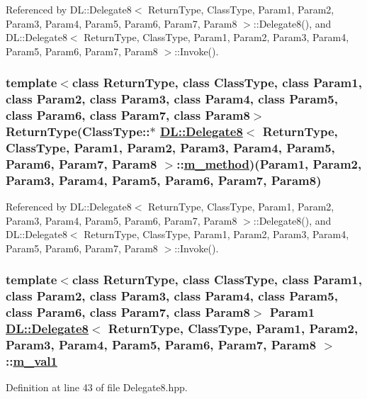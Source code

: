 Referenced by DL::Delegate8$<$ Return\-Type, Class\-Type, Param1, Param2, Param3, Param4, Param5, Param6, Param7, Param8 $>$::Delegate8(), and DL::Delegate8$<$ Return\-Type, Class\-Type, Param1, Param2, Param3, Param4, Param5, Param6, Param7, Param8 $>$::Invoke().\hypertarget{classDL_1_1Delegate8_r1}{
\subsubsection[m\_\-method]{\setlength{\rightskip}{0pt plus 5cm}template$<$class Return\-Type, class Class\-Type, class Param1, class Param2, class Param3, class Param4, class Param5, class Param6, class Param7, class Param8$>$ Return\-Type(Class\-Type::$\ast$ \hyperlink{classDL_1_1Delegate8}{DL::Delegate8}$<$ Return\-Type, Class\-Type, Param1, Param2, Param3, Param4, Param5, Param6, Param7, Param8 $>$::\hyperlink{classDL_1_1Delegate8_r1}{m\_\-method})(Param1, Param2, Param3, Param4, Param5, Param6, Param7, Param8)}}
\label{classDL_1_1Delegate8_r1}




Referenced by DL::Delegate8$<$ Return\-Type, Class\-Type, Param1, Param2, Param3, Param4, Param5, Param6, Param7, Param8 $>$::Delegate8(), and DL::Delegate8$<$ Return\-Type, Class\-Type, Param1, Param2, Param3, Param4, Param5, Param6, Param7, Param8 $>$::Invoke().\hypertarget{classDL_1_1Delegate8_r2}{
\subsubsection[m\_\-val1]{\setlength{\rightskip}{0pt plus 5cm}template$<$class Return\-Type, class Class\-Type, class Param1, class Param2, class Param3, class Param4, class Param5, class Param6, class Param7, class Param8$>$ Param1 \hyperlink{classDL_1_1Delegate8}{DL::Delegate8}$<$ Return\-Type, Class\-Type, Param1, Param2, Param3, Param4, Param5, Param6, Param7, Param8 $>$::\hyperlink{classDL_1_1Delegate8_r2}{m\_\-val1}}}
\label{classDL_1_1Delegate8_r2}




Definition at line 43 of file Delegate8.hpp.

